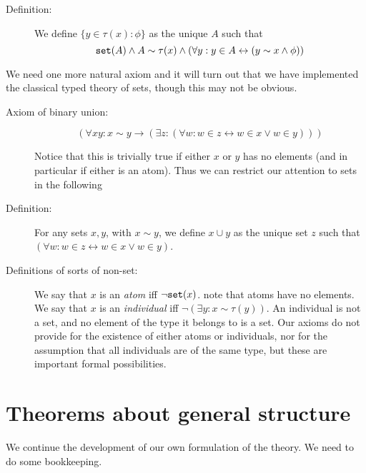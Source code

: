 \documentclass[12pt]{article}
\begin{document}
\begin{description}
\item[Definition:]  We define $\{y \in \tau(x):\phi\}$ as the unique $A$ such that $${\tt set}(A) \wedge A \sim \tau(x) \wedge (\forall y:y \in A \leftrightarrow (y \sim x \wedge \phi))$$

\end{description}


We need one more natural axiom and it will turn out that we have implemented the classical typed theory of sets, though this may not be obvious.

\begin{description}

\item[Axiom of binary union:]  $$(\forall xy: x \sim y \rightarrow (\exists z:(\forall w:w \in z \leftrightarrow w \in x \vee w \in y)))$$

Notice that this is trivially true if either $x$ or $y$ has no elements (and in particular if either is an atom).  Thus we can restrict our attention to sets in the following


\item[Definition:]  For any sets $x,y$, with $x \sim y$, we define $x \cup y$ as the unique set $z$ such that $(\forall w:w \in z \leftrightarrow w \in x \vee w \in y)$.  
\item[Definitions of sorts of non-set:]  We say that $x$ is an {\em atom\/} iff $\neg {\tt set}(x)$.  note that atoms have no elements.  We say that $x$ is an {\em individual\/} iff $\neg(\exists y:x \sim \tau(y))$.  An individual is not a set, and no element of the type it belongs to is a set.  Our axioms do not provide for the existence of either atoms or individuals, nor for the assumption that all individuals are of the same type,  but these are important formal possibilities.

\end{description}



\section{Theorems about general structure}

We continue the development of our own formulation of the theory.  We need to do some bookkeeping.
\end{document}
